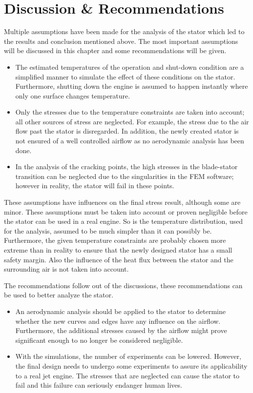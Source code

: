 \section{Discussion \& Recommendations}
\label{Chap:DiscussionRecommendations}
Multiple assumptions have been made for the analysis of the stator which led to the results and conclusion mentioned above. The most important assumptions will be discussed in this chapter and some recommendations will be given.\\
\begin{itemize}
\item The estimated temperatures of the operation and shut-down condition are a simplified manner to simulate the effect of these conditions on the stator. Furthermore, shutting down the engine is assumed to happen instantly where only one surface changes temperature. 
\item Only the stresses due to the temperature constraints are taken into account; all other sources of stress are neglected. For example, the stress due to the air flow past the stator is disregarded. In addition, the newly created stator is not ensured of a well controlled airflow as no aerodynamic analysis has been done.
\item In the analysis of the cracking points, the high stresses in the blade-stator transition can be neglected due to the singularities in the FEM software; however in reality, the stator will fail in these points. 
\end{itemize}
These assumptions have influences on the final stress result, although some are minor. These assumptions must be taken into account or proven negligible before the stator can be used in a real engine. So is the temperature distribution, used for the analysis, assumed to be much simpler than it can possibly be. Furthermore, the given temperature constraints are probably chosen more extreme than in reality to ensure that the newly designed stator has a small safety margin. Also the influence of the heat flux between the stator and the surrounding air is not taken into account. 

The recommendations follow out of the discussions, these recommendations can be used to better analyze the stator.
\begin{itemize}
\item An aerodynamic analysis should be applied to the stator to determine whether the new curves and edges have any influence on the airflow. Furthermore, the additional stresses caused by the airflow might prove significant enough to no longer be considered negligible. 
\item With the simulations, the number of experiments can be lowered. However, the final design needs to undergo some experiments to assure its applicability to a real jet engine. The stresses that are neglected can cause the stator to fail and this failure can seriously endanger human lives.
\end{itemize}


\newpage